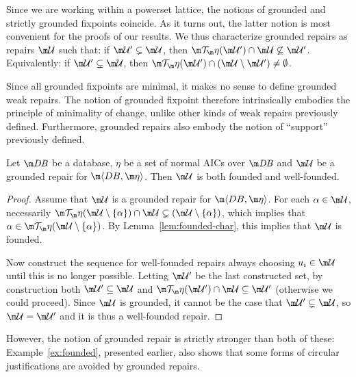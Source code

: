Since we are working within a powerset lattice, the notions of grounded and strictly grounded fixpoints coincide.
As it turns out, the latter notion is most convenient for the proofs of our results.
We thus characterize grounded repairs as repairs $\UU$ such that: if $\UU'\subsetneq\UU$, then $\Op(\UU')\cap\UU\not\subseteq\UU'$.
Equivalently: if $\UU'\subsetneq\UU$, then $\Op(\UU')\cap(\UU\setminus\UU')\neq\emptyset$.

Since all grounded fixpoints are minimal, it makes no sense to define grounded weak repairs.
The notion of grounded fixpoint therefore intrinsically embodies the principle of minimality of change, unlike other kinds of weak repairs previously defined.
Furthermore, grounded repairs also embody the notion of ``support'' previously defined.

\begin{lemma}
  \label{lem:founded}
  Let $\db$ be a database, $\eta$ be a set of normal AICs over $\db$ and $\UU$ be a grounded repair for $\fulldb$.
  Then $\UU$ is both founded and well-founded.
\end{lemma}
\begin{proof}
  Assume that $\UU$ is a grounded repair for $\fulldb$.
  For each $\alpha\in\UU$, necessarily $\Op(\UU\setminus\{\alpha\})\cap\UU\subsetneq(\UU\setminus\{\alpha\})$, which implies that $\alpha\in\Op(\UU\setminus\{\alpha\})$.
  By Lemma~\ref{lem:founded-char}, this implies that $\UU$ is founded.

  Now construct the sequence for well-founded repairs always choosing $u_i\in\UU$ until this is no longer possible.
  Letting $\UU'$ be the last constructed set, by construction both $\UU'\subseteq\UU$ and $\Op(\UU')\cap\UU\subseteq\UU'$ (otherwise we could proceed).
  Since $\UU$ is grounded, it cannot be the case that $\UU'\subsetneq\UU$, so $\UU=\UU'$ and it is thus a well-founded repair.
\end{proof}

However, the notion of grounded repair is strictly stronger than both of these: Example~\ref{ex:founded}, presented earlier, also shows that some forms of circular justifications are avoided by grounded repairs.

